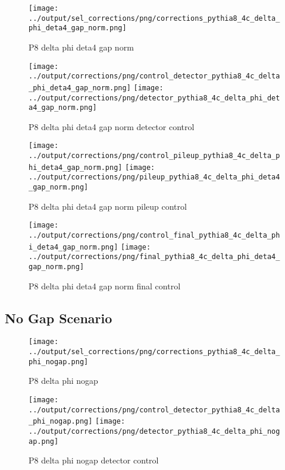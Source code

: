 \documentclass[11pt]{book}
\begin{document}
\begin{figure}[ht]
\centering
\texttt{[image: ../output/sel\_corrections/png/corrections\_pythia8\_4c\_delta\_phi\_deta4\_gap\_norm.png]}
\caption{P8 delta phi deta4 gap norm}
\label{fig:p8_delta_phi_deta4_gap_norm}
\end{figure}


\begin{figure}[ht]
\centering
\texttt{[image: ../output/corrections/png/control\_detector\_pythia8\_4c\_delta\_phi\_deta4\_gap\_norm.png]}
\texttt{[image: ../output/corrections/png/detector\_pythia8\_4c\_delta\_phi\_deta4\_gap\_norm.png]}
\caption{P8 delta phi deta4 gap norm detector control}
\label{fig:p8_delta_phi_deta4_gap_norm_detector_control}
\end{figure}

\begin{figure}[ht]
\centering
\texttt{[image: ../output/corrections/png/control\_pileup\_pythia8\_4c\_delta\_phi\_deta4\_gap\_norm.png]}
\texttt{[image: ../output/corrections/png/pileup\_pythia8\_4c\_delta\_phi\_deta4\_gap\_norm.png]}
\caption{P8 delta phi deta4 gap norm pileup control}
\label{fig:p8_delta_phi_deta4_gap_norm_pileup_control}
\end{figure}


\begin{figure}[ht]
\centering
\texttt{[image: ../output/corrections/png/control\_final\_pythia8\_4c\_delta\_phi\_deta4\_gap\_norm.png]}
\texttt{[image: ../output/corrections/png/final\_pythia8\_4c\_delta\_phi\_deta4\_gap\_norm.png]}
\caption{P8 delta phi deta4 gap norm final control}
\label{fig:p8_delta_phi_deta4_gap_norm_final_control}
\end{figure}


\clearpage
\subsection{No Gap Scenario}
\begin{figure}[ht]
\centering
\texttt{[image: ../output/sel\_corrections/png/corrections\_pythia8\_4c\_delta\_phi\_nogap.png]}
\caption{P8 delta phi nogap}
\label{fig:p8_delta_phi_nogap}
\end{figure}

\begin{figure}[ht]
\centering
\texttt{[image: ../output/corrections/png/control\_detector\_pythia8\_4c\_delta\_phi\_nogap.png]}
\texttt{[image: ../output/corrections/png/detector\_pythia8\_4c\_delta\_phi\_nogap.png]}
\caption{P8 delta phi nogap detector control}
\label{fig:p8_delta_phi_nogap_detector_control}
\end{figure}
\end{document}
